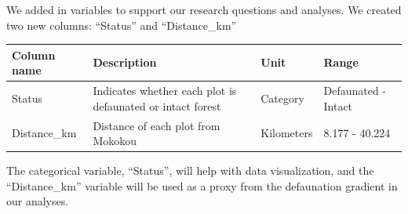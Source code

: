 \documentclass[
  12pt,
]{article}
\begin{document}
We added in variables to support our research questions and analyses. We
created two new columns: ``Status'' and ``Distance\_km''

\begin{longtable}[]{@{}llll@{}}
\toprule
\begin{minipage}[b]{0.22\columnwidth}\raggedright
Column name\strut
\end{minipage} & \begin{minipage}[b]{0.32\columnwidth}\raggedright
Description\strut
\end{minipage} & \begin{minipage}[b]{0.17\columnwidth}\raggedright
Unit\strut
\end{minipage} & \begin{minipage}[b]{0.17\columnwidth}\raggedright
Range\strut
\end{minipage}\tabularnewline
\midrule
\endhead
\begin{minipage}[t]{0.22\columnwidth}\raggedright
Status\strut
\end{minipage} & \begin{minipage}[t]{0.32\columnwidth}\raggedright
Indicates whether each plot is defaunated or intact forest\strut
\end{minipage} & \begin{minipage}[t]{0.17\columnwidth}\raggedright
Category\strut
\end{minipage} & \begin{minipage}[t]{0.17\columnwidth}\raggedright
Defaunated - Intact\strut
\end{minipage}\tabularnewline
\begin{minipage}[t]{0.22\columnwidth}\raggedright
Distance\_km\strut
\end{minipage} & \begin{minipage}[t]{0.32\columnwidth}\raggedright
Distance of each plot from Mokokou\strut
\end{minipage} & \begin{minipage}[t]{0.17\columnwidth}\raggedright
Kilometers\strut
\end{minipage} & \begin{minipage}[t]{0.17\columnwidth}\raggedright
8.177 - 40.224\strut
\end{minipage}\tabularnewline
\bottomrule
\end{longtable}

The categorical variable, ``Status'', will help with data visualization,
and the ``Distance\_km'' variable will be used as a proxy from the
defaunation gradient in our analyses.
\end{document}
